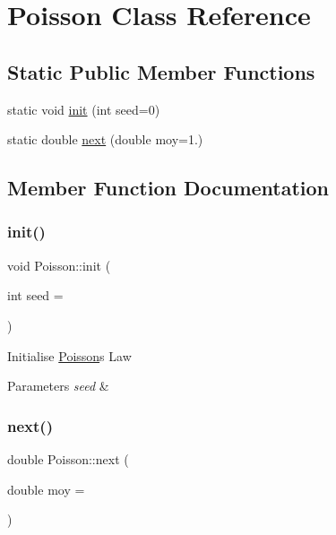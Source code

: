 \hypertarget{classPoisson}{}\section{Poisson Class Reference}
\label{classPoisson}
\subsection*{Static Public Member Functions}
\begin{DoxyCompactItemize}
\item 
static void \hyperlink{classPoisson_ac616eec569fc0291dbd1cacf0f73108e}{init} (int seed=0)
\item 
static double \hyperlink{classPoisson_aaf4f6c620dba71a1e02fdb2a99f1f031}{next} (double moy=1.)
\end{DoxyCompactItemize}


\subsection{Member Function Documentation}
\mbox{\label{classPoisson_ac616eec569fc0291dbd1cacf0f73108e}} 
\subsubsection{\texorpdfstring{init()}{init()}}
{\footnotesize\ttfamily void Poisson\+::init (\begin{DoxyParamCaption}\item[{int}]{seed = {} }\end{DoxyParamCaption})\hspace{0.3cm}{\ttfamily [static]}}

Initialise \hyperlink{classPoisson}{Poisson}\textquotesingle{}s Law 
\begin{DoxyParams}{Parameters}
{\em seed} & \\
\hline
\end{DoxyParams}
\mbox{\label{classPoisson_aaf4f6c620dba71a1e02fdb2a99f1f031}} 
\subsubsection{\texorpdfstring{next()}{next()}}
{\footnotesize\ttfamily double Poisson\+::next (\begin{DoxyParamCaption}\item[{double}]{moy = {} }\end{DoxyParamCaption})\hspace{0.3cm}{\ttfamily [static]}}

